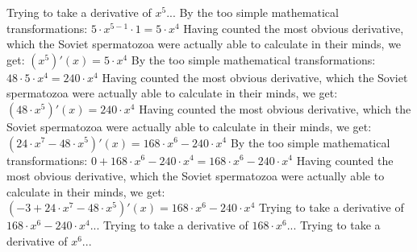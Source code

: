 \documentclass[a4paper, 12pt]{article}
\begin{document}
\newline
Trying to take a derivative of ${{x} ^ {5}}$...\newline
\newline
By the too simple mathematical transformations:
 ${{{5} \cdot {{x} ^ {{5} - {1}}}} \cdot {1}} = {{5} \cdot {{x} ^ {4}}}$ 
 \newline
 \newline 
Having counted the most obvious derivative, which the Soviet spermatozoa were actually able to calculate in their minds, we get:
$({{x} ^ {5}})'(x) = {{5} \cdot {{x} ^ {4}}}$\newline
\newline
By the too simple mathematical transformations:
 ${{48} \cdot {{5} \cdot {{x} ^ {4}}}} = {{240} \cdot {{x} ^ {4}}}$ 
 \newline
 \newline 
Having counted the most obvious derivative, which the Soviet spermatozoa were actually able to calculate in their minds, we get:
$({{48} \cdot {{x} ^ {5}}})'(x) = {{240} \cdot {{x} ^ {4}}}$\newline
\newline
Having counted the most obvious derivative, which the Soviet spermatozoa were actually able to calculate in their minds, we get:
$({{{24} \cdot {{x} ^ {7}}} - {{48} \cdot {{x} ^ {5}}}})'(x) = {{{168} \cdot {{x} ^ {6}}} - {{240} \cdot {{x} ^ {4}}}}$\newline
\newline
By the too simple mathematical transformations:
 ${{0} + {{{168} \cdot {{x} ^ {6}}} - {{240} \cdot {{x} ^ {4}}}}} = {{{168} \cdot {{x} ^ {6}}} - {{240} \cdot {{x} ^ {4}}}}$ 
 \newline
 \newline 
Having counted the most obvious derivative, which the Soviet spermatozoa were actually able to calculate in their minds, we get:
$({{-3} + {{{24} \cdot {{x} ^ {7}}} - {{48} \cdot {{x} ^ {5}}}}})'(x) = {{{168} \cdot {{x} ^ {6}}} - {{240} \cdot {{x} ^ {4}}}}$\newline
\newline
Trying to take a derivative of ${{{168} \cdot {{x} ^ {6}}} - {{240} \cdot {{x} ^ {4}}}}$...\newline
\newline
Trying to take a derivative of ${{168} \cdot {{x} ^ {6}}}$...\newline
\newline
Trying to take a derivative of ${{x} ^ {6}}$...\newline
\end{document}
